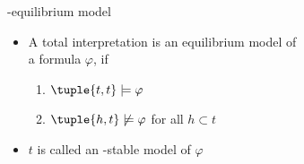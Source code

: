 \begin{frame}{\HTC-equilibrium model}
  \begin{itemize}
  \item A total interpretation  is an \alert{equilibrium model} of\\
    a formula $\varphi$,
    if
    \par
    \smallskip
    \begin{enumerate}\normalsize
    \item
      \(
      \tuple{t,t}\models\varphi
      \)
    \item
      \(
      \tuple{h,t}\not\models\varphi
      \)
      for all $h\subset t$
    \end{enumerate}
    \smallskip
  \item <2-> $t$ is called an \HTC-\alert{stable model} of $\varphi$
  \end{itemize}
\end{frame}
